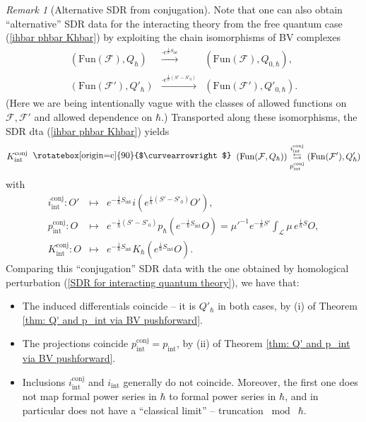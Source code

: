 \documentclass{amsart}
\theoremstyle{plain} %
\theoremstyle{definition}
\theoremstyle{remark}
\newtheorem{rem}[thm]{Remark}
\newcommand{\mr}{\mathrm}
\newcommand{\F}{\mathcal{F}}
\newcommand{\LL}{\mathcal{L}}
\newcommand{\xra}{\xrightarrow}
\newcommand{\ii}{\mathrm{int}}
\newcommand{\iii}{\mathrm{i}}
\newcommand{\SDR}[5]{#5\;\;\raisebox{1.3pt}{\rotatebox[origin=c]{90}{$\curvearrowright$}}\;\; #1 \underset{#4}{\stackrel{#3}{\leftrightarrows}} #2}  %
\begin{document}
\begin{rem}[Alternative SDR from conjugation]\label{rem: SDR for interacting theory from conjugation}
    Note that one can also obtain ``alternative'' SDR data for the interacting theory from the free quantum case (\ref{ihbar phbar Khbar}) by %
    exploiting the chain isomorphisms of BV complexes
    \begin{eqnarray}
        (\mr{Fun}(\F), Q_{\hbar} %
        ) &\xra{\cdot e^{\frac{\iii}{\hbar}S_\ii}}&
        (\mr{Fun}(\F),Q_{0,\hbar}),\\ 
        (\mr{Fun}(\F'), Q'_{\hbar} %
        ) &\xra{\cdot e^{\frac{\iii}{\hbar}(S'-S'_0)}}&
        (\mr{Fun}(\F'),Q'_{0,\hbar}).
    \end{eqnarray}
    (Here we are being intentionally vague with the classes of allowed functions on $\F,\F'$ and allowed dependence on $\hbar$.)
    Transported along these isomorphisms, the SDR dta (\ref{ihbar phbar Khbar}) yields
    \begin{equation}\label{SDR for interacting theory from conjugation}
        \SDR{(\mr{Fun}(\F,Q_\hbar))}{(\mr{Fun}(\F'),Q'_\hbar)}{i^\mr{conj}_\ii}{p^\mr{conj}_\ii}{K^\mr{conj}_\ii}
    \end{equation}
    with 
    \begin{eqnarray}
        i^\mr{conj}_\ii\colon O' &\mapsto& e^{-\frac{\iii}{\hbar}S_\ii}i( e^{\frac{\iii}{\hbar}(S'-S'_0)}O'),\\
        p^\mr{conj}_\ii\colon O &\mapsto & e^{-\frac{\iii}{\hbar}(S'-S'_0)} p_\hbar (e^{-\frac{\iii}{\hbar}S_\ii}O)=\mu'^{-1}e^{-\frac{\iii}{\hbar}S'} \int_\LL \mu\, e^{\frac{\iii}{\hbar}S} O
        ,\\
        K^\mr{conj}_\ii\colon O &\mapsto & e^{-\frac{\iii}{\hbar}S_\ii} K_\hbar
        (e^{\frac{\iii}{\hbar}S_\ii} O).
    \end{eqnarray}
    Comparing this ``conjugation'' SDR data with the one obtained by homological perturbation (\ref{SDR for interacting quantum theory}), we have that:
    \begin{itemize}
        \item The induced differentials coincide -- it is $Q'_\hbar$ in both cases, by (i) of Theorem \ref{thm: Q' and p_int via BV pushforward}.
        \item The projections coincide $p^\mr{conj}_\ii=p_\ii$, by (ii) of Theorem \ref{thm: Q' and p_int via BV pushforward}.
        \item Inclusions $i^\mr{conj}_\ii$ and $i_\ii$ generally do not coincide. Moreover, the first one does not map formal power series in $\hbar$ to formal power series in $\hbar$, and in particular does not have a ``classical limit'' -- truncation $\bmod\; \hbar$. 

\end{itemize}
\end{rem}
\end{document}

